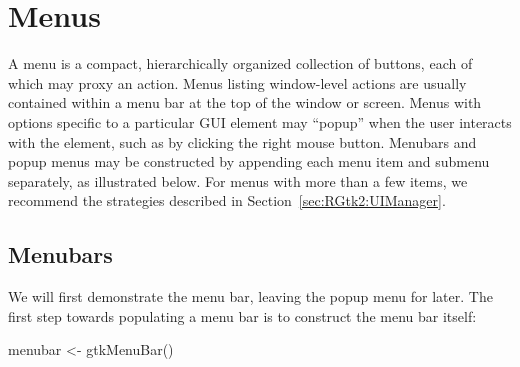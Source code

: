 \section{Menus}
\label{sec:RGtk2:menus}

A menu is a compact, hierarchically organized collection of buttons,
each of which may proxy an action. Menus listing window-level actions
are usually contained within a menu bar at the top of the window or
screen. Menus with options specific to a particular GUI element may
``popup'' when the user interacts with the element, such as by
clicking the right mouse button. Menubars and popup menus may be
constructed by appending each menu item and submenu separately, as
illustrated below. For menus with more than a few items, we recommend
the strategies described in Section~\ref{sec:RGtk2:UIManager}.

\subsection{Menubars}

We will first demonstrate the menu bar, leaving the popup menu for
later.  The first step towards populating a menu bar is to construct
the menu bar itself:
\begin{Schunk}
\begin{Sinput}
 menubar <- gtkMenuBar()
\end{Sinput}
\end{Schunk}

